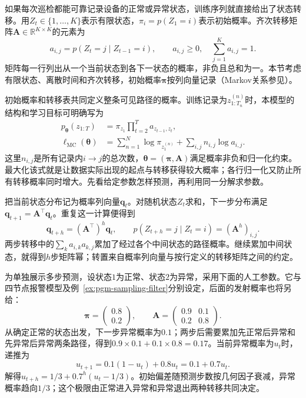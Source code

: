 如果每次巡检都能可靠记录设备的正常或异常状态，训练序列就直接给出了状态转移。用$Z_t\in\{1,\ldots,K\}$表示有限状态，$\pi_i=p(Z_1=i)$表示初始概率。齐次转移矩阵$\bm{A}\in\mathbb{R}^{K\times K}$的元素为
\[
  a_{i,j}=p(Z_t=j\mid Z_{t-1}=i),\qquad
  a_{i,j}\geq0,\quad \sum_{j=1}^{K}a_{i,j}=1.
\]
矩阵每一行列出从一个当前状态到各下一状态的概率，非负且总和为一。本节考虑有限状态、离散时间和齐次转移，初始概率$\bm\pi$按列向量记录（Markov关系参见）。

初始概率和转移表共同定义整条可见路径的概率。训练记录为$z^{(n)}_{1:T_n}$时，本模型的结构和学习目标可明确写为
\begin{equation}
  \begin{aligned}
    p_{\bm\theta}(z_{1:T})&=\pi_{z_1}
       \prod_{t=2}^{T}a_{z_{t-1},z_t},\\
    \ell_{\mathrm{MC}}(\bm\theta)
       &=\sum_{n=1}^{N}\log\pi_{z^{(n)}_1}
           +\sum_{i,j}n_{i,j}\log a_{i,j}.
  \end{aligned}
  \label{eq:pgm-dynamic-visible-objective}
\end{equation}
这里$n_{i,j}$是所有记录内$i\to j$的总次数，$\bm\theta=(\bm\pi,\bm A)$满足概率非负和归一化约束。最大化该式就是让数据实际出现的起点与转移获得较大概率；各行归一化又防止所有转移概率同时增大。先看给定参数怎样预测，再利用同一分解求参数。

把当前状态分布记为概率列向量$\bm{q}_t$。对随机状态$Z_t$求和，下一步分布满足$\bm{q}_{t+1}=\bm{A}^{\top}\bm{q}_t$。重复这一计算便得到
\begin{equation}
  \bm{q}_{t+h}=(\bm{A}^{\top})^h\bm{q}_t,\qquad
  p(Z_{t+h}=j\mid Z_t=i)=(\bm{A}^h)_{i,j}.
  \label{eq:pgm-dynamic-markov-prediction}
\end{equation}
两步转移中的$\sum_k a_{i,k}a_{k,j}$累加了经过各个中间状态的路径概率。继续累加中间状态，就得到$h$步矩阵幂；转置来自概率列向量与按行定义的转移矩阵之间的约定。

\begin{example}[两状态设备的多步预测]
  \label{ex:pgm-dynamic-markov}
  为单独展示多步预测，设状态$1$为正常、状态$2$为异常，采用下面的人工参数。它与四节点报警模型及例~\ref{ex:pgm-sampling-filter}分别设定，后面的发射概率也将另给：
  \[
    \bm{\pi}=\begin{pmatrix}0.8\\0.2\end{pmatrix},\qquad
    \bm{A}=
    \begin{pmatrix}0.9&0.1\\0.2&0.8\end{pmatrix}.
  \]
  从确定正常的状态出发，下一步异常概率为$0.1$；两步后需要累加先正常后异常和先异常后异常两条路径，得到$0.9\times0.1+0.1\times0.8=0.17$。当前异常概率为$u_t$时，递推为
  \[
    u_{t+1}=0.1(1-u_t)+0.8u_t=0.1+0.7u_t.
  \]
  解得$u_{t+h}=1/3+0.7^h(u_t-1/3)$。初始偏差随预测步数按几何因子衰减，异常概率趋向$1/3$；这个极限由正常进入异常和异常退出两种转移共同决定。
\end{example}

